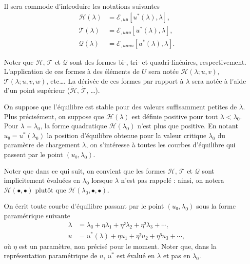 \documentclass[12pt, final]{amsart}
\begin{document}
Il sera commode d'introduire les notations suivantes
\begin{align}
  \mathcal H(\lambda)&=ℰ_{,uu}[u^\ast(\lambda), \lambda],\\
  \mathcal T(\lambda)&=ℰ_{,uuu}[u^\ast(\lambda), \lambda],\\
  \mathcal Q(\lambda)&=ℰ_{,uuuu}[u^\ast(\lambda), \lambda].
\end{align}

Noter que \(\mathcal H\), \(\mathcal T\) et \(\mathcal Q\) sont des formes bi-,
tri- et quadri-linéaires, respectivement. L'application de ces formes à des
éléments de \(U\) sera notée \(\mathcal H(\lambda; u, v)\),
\(\mathcal T(\lambda; u, v, w)\), etc\dots. La dérivée de ces formes par
rapport à \(\lambda\) sera notée à l'aide d'un point supérieur
(\(\dot{\mathcal H}\), \(\dot{\mathcal T}\), \dots).

On suppose que l'équilibre est stable pour des valeurs suffisamment petites de
\(\lambda\). Plus précisément, on suppose que \(\mathcal H(\lambda)\) est
définie positive pour tout \(\lambda<\lambda_0\). Pour \(\lambda=\lambda_0\),
la forme quadratique \(\mathcal H(\lambda_0)\) n'est plus que positive. En
notant \(u₀=u^\ast(\lambda_0)\) la position d'équilibre obtenue pour la valeur
critique \(\lambda_0\) du paramètre de chargement \(\lambda\), on s'intéresse à
toutes les courbes d'équilibre qui passent par le point \((u₀, \lambda_0)\).

Noter que dans ce qui suit, on convient que les formes \(\mathcal H\),
\(\mathcal T\) et \(\mathcal Q\) sont implicitement évaluées en \(\lambda_0\)
lorsque \(\lambda\) n'est pas rappelé : ainsi, on notera
\(\mathcal H(•, •)\) plutôt que
\(\mathcal H(\lambda_0, •, •)\).

On écrit toute courbe d'équilibre passant par le point \((u₀, \lambda_0)\)
sous la forme paramétrique suivante
\begin{align}
  \label{eq:20211115075817}
  \lambda&=\lambda_0+η\lambda_1+η²\lambda_2+η³\lambda_3+\cdots,\\
  \label{eq:20211115075835}
  u&=u^\ast(\lambda)+η u_1+η² u_2+η³u_3+\cdots,
\end{align}
où \(η\) est un paramètre, non précisé pour le moment. Noter que, dans la
représentation paramétrique de \(u\), \(u^\ast\) est évalué en \(\lambda\) et
pas en \(\lambda_0\).
\end{document}
